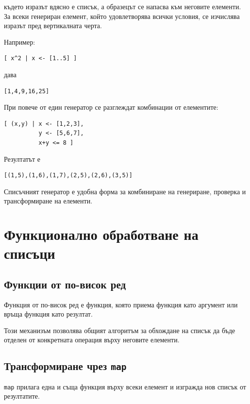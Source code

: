 където изразът вдясно е списък, а образецът се напасва към неговите елементи. За всеки генериран елемент, който удовлетворява всички условия, се изчислява изразът пред вертикалната черта.

Например:

\begin{verbatim}
[ x^2 | x <- [1..5] ]
\end{verbatim}

дава

\begin{verbatim}
[1,4,9,16,25]
\end{verbatim}

При повече от един генератор се разглеждат комбинации от елементите:

\begin{verbatim}
[ (x,y) | x <- [1,2,3],
          y <- [5,6,7],
          x+y <= 8 ]
\end{verbatim}

Резултатът е

\begin{verbatim}
[(1,5),(1,6),(1,7),(2,5),(2,6),(3,5)]
\end{verbatim}

Списъчният генератор е удобна форма за комбиниране на генериране, проверка и трансформиране на елементи.

\section{Функционално обработване на списъци}\label{s:20.4}

\subsection{Функции от по-висок ред}\label{s:20.4.1}

\begin{defn}
Функция от по-висок ред е функция, която приема функция като аргумент или връща функция като резултат.
\end{defn}

Този механизъм позволява общият алгоритъм за обхождане на списък да бъде отделен от конкретната операция върху неговите елементи.

\subsection{Трансформиране чрез \texttt{map}}\label{s:20.4.2}

\texttt{map} прилага една и съща функция върху всеки елемент и изгражда нов списък от резултатите.

